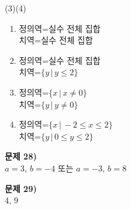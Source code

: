 \documentclass{oblivoir}
\newcounter{num}
\newcommand\an[1]{\par\bigskip\noindent\textbf{문제 #1)}\\}
\newcommand\ba{\,|\,}
\begin{document}
\begin{minipage}{0.49\textwidth}
\begin{center}
\par\noindent(3)\qquad\qquad\qquad\quad\:\:(4)
\end{center}
\begin{enumerate}[topsep=0pt]
\item
정의역=실수 전체 집합\\
치역=실수 전체 집합
\item
정의역=실수 전체 집합\\
치역=\(\{y\ba y\le2\}\)
\item
정의역=\(\{x\ba x\neq0\}\)\\
치역=\(\{y\ba y\neq0\}\)
\item
정의역=\(\{x\ba -2\le x\le2\}\)\\
치역=\(\{y\ba 0\le y\le2\}\)
\end{enumerate}

%
\an{28}
\(a=3\), \(b=-4\)
또는
\(a=-3\), \(b=8\)

%
\an{29}
\(4\), \(9\)
\end{minipage}
\end{document}
